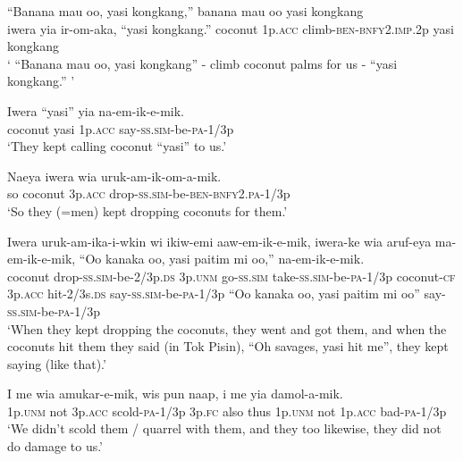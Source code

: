 {\ea\label{ex:a:x43}
\gll  “Banana  mau  oo,  yasi  kongkang,” banana  mau  oo  yasi  kongkang\\ 
iwera  yia  ir-om-aka,  “yasi  kongkang.” coconut  1p.\textsc{acc}  climb-\textsc{ben}-\textsc{bnfy}2.\textsc{imp}.2p  yasi  kongkang  \\ 
\glt ‘ “Banana mau oo, yasi kongkang” - climb coconut palms for us - “yasi kongkang.” ’ \\
\z


\ea\label{ex:a:x44}
\gll  Iwera  “yasi”  yia  na-em-ik-e-mik. \\
coconut  yasi  1p.\textsc{acc}  say-\textsc{ss}.\textsc{sim}-be-\textsc{pa}-1/3p \\
\glt ‘They kept calling coconut “yasi” to us.’ \\
\z


\ea\label{ex:a:x45}
\gll  Naeya  iwera  wia  uruk-am-ik-om-a-mik. \\
so  coconut  3p.\textsc{acc}  drop-\textsc{ss}.\textsc{sim}-be-\textsc{ben}-\textsc{bnfy}2.\textsc{pa}-1/3p \\
\glt ‘So they (=men) kept dropping coconuts for them.’ \\
\z


\ea\label{ex:a:x46}
\gll  Iwera  uruk-am-ika-i-wkin  wi  ikiw-emi  aaw-em-ik-e-mik,  iwera-ke  wia  aruf-eya   ma-em-ik-e-mik,  “Oo  kanaka  oo,  yasi  paitim  mi  oo,” na-em-ik-e-mik. \\
coconut  drop-\textsc{ss}.\textsc{sim}-be-2/3p.\textsc{ds}  3p.\textsc{unm}  go-\textsc{ss}.\textsc{sim} take-\textsc{ss}.\textsc{sim}-be-\textsc{pa}-1/3p  coconut-\textsc{cf}  3p.\textsc{acc}  hit-2/3s.\textsc{ds} say-\textsc{ss}.\textsc{sim}-be-\textsc{pa}-1/3p  “Oo  kanaka  oo,  yasi  paitim  mi  oo” say-\textsc{ss}.\textsc{sim}-be-\textsc{pa}-1/3p\\
\glt ‘When they kept dropping the coconuts, they went and got them, and when the coconuts hit them they said (in Tok Pisin), “Oh savages, yasi hit me”, they kept saying (like that).’ \\
\z


\ea\label{ex:a:x47}
\gll  I  me  wia  amukar-e-mik,  wis  pun  naap, i  me  yia  damol-a-mik. \\
1p.\textsc{unm}  not  3p.\textsc{acc}  scold-\textsc{pa}-1/3p  3p.\textsc{fc}  also  thus 1p.\textsc{unm}  not  1p.\textsc{acc}  bad-\textsc{pa}-1/3p \\ 
\glt ‘We didn’t scold them / quarrel with them, and they too likewise, they did not do damage to us.’ \\
\z


}
